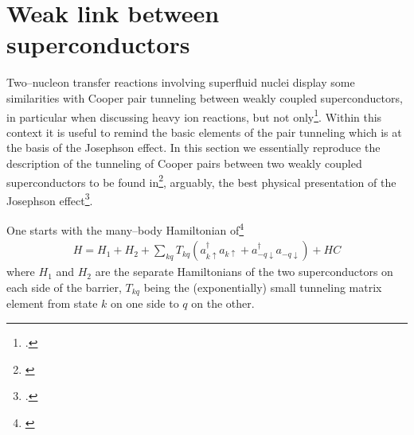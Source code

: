 \section{Weak link between superconductors}\label{C3AppC}
Two--nucleon transfer reactions involving superfluid nuclei display some similarities with Cooper pair tunneling between weakly coupled superconductors, in particular when discussing heavy ion reactions, but not only\footnote{\cite{vonOertzen:01,Oertzen:13,Broglia:04a}.}. Within this context it is useful to remind the basic elements of the pair tunneling which is at the basis of the Josephson effect. 
In this section we essentially reproduce the description of the tunneling of Cooper pairs between two weakly coupled superconductors to be found in\footnote{\cite{Anderson:64b}}, arguably, the best physical presentation of the Josephson effect\footnote{\cite{Josephson:62}.}.


One starts with the many--body Hamiltonian of\footnote{\cite{Cohen:62}}
\begin{align}\label{eq3.C.1}
H=H_1+H_2+\sum_{kq}T_{kq}(a_{k\uparrow}^\dagger a_{k\uparrow}+a_{-q\downarrow}^\dagger a_{-q\downarrow})+HC
\end{align}
where $H_1$ and $H_2$ are the separate Hamiltonians of the two superconductors on each side of the barrier, $T_{kq}$ being the (exponentially) small tunneling matrix element from state $k$ on one side to $q$ on the other.


